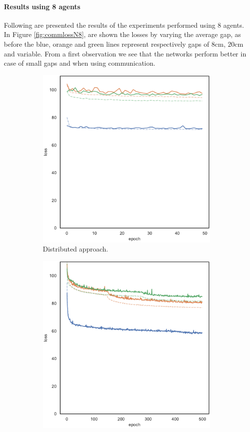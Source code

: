 \paragraph*{Results using 8 agents}
Following are presented the results of the experiments performed using 
$8$ agents. In Figure \ref{fig:commlossN8}, are shown the losses by varying the 
average gap, as before the blue, orange and green lines represent respectively 
gaps of $8$\gls{cm}, $20$\gls{cm} and variable. From a first observation we see 
that the networks perform better in case of small gaps and when using 
communication.
\begin{figure}[!htb]
	\begin{center}
		\begin{subfigure}[h]{0.49\textwidth}
			\centering
			\includegraphics[width=.7\textwidth]{contents/images/task1-comm-extension/loss-distributed-N8@copy}
			\caption{Distributed approach.}
		\end{subfigure}
		\hfill
		\begin{subfigure}[h]{0.49\textwidth}
			\centering
			\includegraphics[width=.7\textwidth]{contents/images/task1-comm-extension/loss-communication-N8@copy}

\end{subfigure}
\end{center}
\end{figure}
